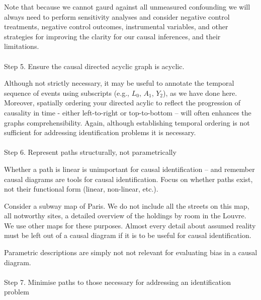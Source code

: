 \documentclass[
  single column]{article}
\makeatletter
\let\oldparagraph\paragraph
\renewcommand{\paragraph}{
    \@ifstar
      \xxxParagraphStar
      \xxxParagraphNoStar
  }
\newcommand{\xxxParagraphStar}[1]{\oldparagraph*{#1}\mbox{}}
\newcommand{\xxxParagraphNoStar}[1]{\oldparagraph{#1}\mbox{}}
\makeatother
\begin{document}
Note that because we cannot gaurd against all unmeasured confounding we
will always need to perform sensitivity analyses and consider negative
control treatments, negative control outcomes, instrumental variables,
and other strategies for improving the clarity for our causal
inferences, and their limitations.

\paragraph{Step 5. Ensure the causal directed acyclic graph is
acyclic.}\label{step-5.-ensure-the-causal-directed-acyclic-graph-is-acyclic.}

Although not strictly necessary, it may be useful to annotate the
temporal sequence of events using subscripts (e.g., \(L_0\), \(A_1\),
\(Y_2\)), as we have done here. Moreover, spatially ordering your
directed acylic to reflect the progression of causality in time - either
left-to-right or top-to-bottom -- will often enhances the graphs
comprehensibility. Again, although establishing temporal ordering is not
sufficient for addressing identification problems it is necessary.

\paragraph{Step 6. Represent paths structurally, not
parametrically}\label{step-6.-represent-paths-structurally-not-parametrically}

Whether a path is linear is unimportant for causal identification -- and
remember causal diagrams are tools for causal identification. Focus on
whether paths exist, not their functional form (linear, non-linear,
etc.).

Consider a subway map of Paris. We do not include all the streets on
this map, all notworthy sites, a detailed overview of the holdings by
room in the Louvre. We use other maps for these purposes. Almost every
detail about assumed reality must be left out of a causal diagram if it
is to be useful for causal identification.

Parametric descriptions are simply not not relevant for evaluating bias
in a causal diagram.

\paragraph{Step 7. Minimise paths to those necessary for addressing an
identification
problem}\label{step-7.-minimise-paths-to-those-necessary-for-addressing-an-identification-problem}
\end{document}
